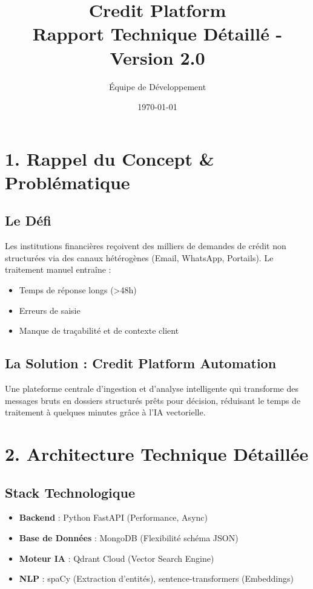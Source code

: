 \documentclass[11pt]{article}
\title{\textbf{Credit Platform}\\Rapport Technique Détaillé - Version 2.0}
\author{Équipe de Développement}
\date{\today}
\begin{document}
\maketitle
\tableofcontents
\newpage

\section{1. Rappel du Concept & Problématique}
\subsection{Le Défi}
Les institutions financières reçoivent des milliers de demandes de crédit non structurées via des canaux hétérogènes (Email, WhatsApp, Portails). Le traitement manuel entraîne :
\begin{itemize}
    \item Temps de réponse longs (>48h)
    \item Erreurs de saisie
    \item Manque de traçabilité et de contexte client
\end{itemize}

\subsection{La Solution : Credit Platform Automation}
Une plateforme centrale d'ingestion et d'analyse intelligente qui transforme des messages bruts en dossiers structurés prêts pour décision, réduisant le temps de traitement à quelques minutes grâce à l'IA vectorielle.

\section{2. Architecture Technique Détaillée}

\subsection{Stack Technologique}
\begin{itemize}
    \item \textbf{Backend} : Python FastAPI (Performance, Async)
    \item \textbf{Base de Données} : MongoDB (Flexibilité schéma JSON)
    \item \textbf{Moteur IA} : Qdrant Cloud (Vector Search Engine)
    \item \textbf{NLP} : spaCy (Extraction d'entités), sentence-transformers (Embeddings)
\end{itemize}
\end{document}
